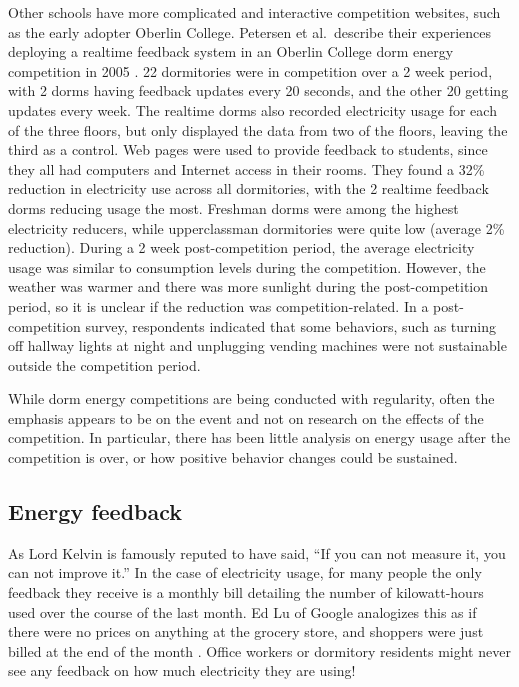 Other schools have more complicated and interactive competition websites, such as the early adopter Oberlin College. Petersen et al.\ describe their experiences deploying a realtime feedback system in an Oberlin College dorm energy competition in 2005 \cite{petersen-dorm-energy-reduction}. 22 dormitories were in competition over a 2 week period, with 2 dorms having feedback updates every 20 seconds, and the other 20 getting updates every week. The realtime dorms also recorded electricity usage for each of the three floors, but only displayed the data from two of the floors, leaving the third as a control. Web pages were used to provide feedback to students, since they all had computers and Internet access in their rooms. They found a 32\% reduction in electricity use across all dormitories, with the 2 realtime feedback dorms reducing usage the most. Freshman dorms were among the highest electricity reducers, while upperclassman dormitories were quite low (average 2\% reduction). During a 2 week post-competition period, the average electricity usage was similar to consumption levels during the competition. However, the weather was warmer and there was more sunlight during the post-competition period, so it is unclear if the reduction was competition-related. In a post-competition survey, respondents indicated that some behaviors, such as turning off hallway lights at night and unplugging vending machines were not sustainable outside the competition period.

While dorm energy competitions are being conducted with regularity, often the emphasis appears to be on the event and not on research on the effects of the competition. In particular, there has been little analysis on energy usage after the competition is over, or how positive behavior changes could be sustained.

\subsection{Energy feedback}

As Lord Kelvin is famously reputed to have said, ``If you can not measure it, you can not improve it.'' In the case of electricity usage, for many people the only feedback they receive is a monthly bill detailing the number of kilowatt-hours used over the course of the last month. Ed Lu of Google analogizes this as if there were no prices on anything at the grocery store, and shoppers were just billed at the end of the month \cite{Helft2008Googles-Energy}. Office workers or dormitory residents might never see any feedback on how much electricity they are using!

